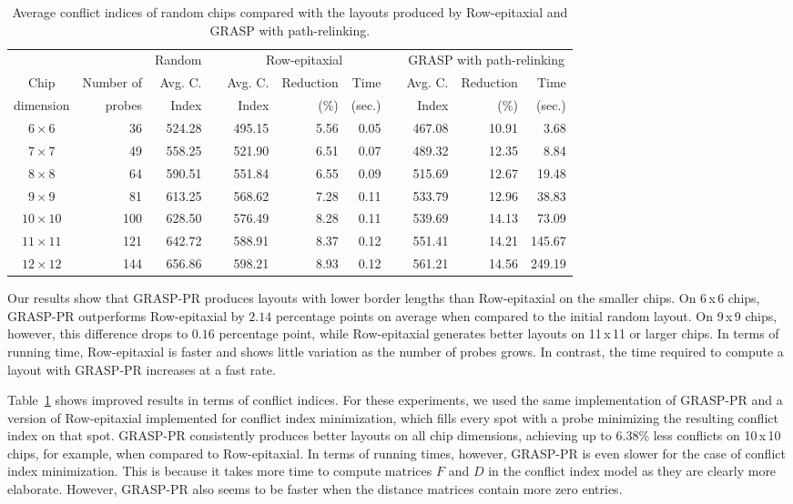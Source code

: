 \documentclass[english]{lni}
\begin{document}
\begin{table}[t]
\caption{Average conflict indices of random chips compared with the layouts produced by
Row-epitaxial and GRASP with path-relinking.\label{tab:graspr_reptx_ci}}
\vspace*{2ex}
\scriptsize{
\begin{tabular}{crrcrrrcrrr}
          &            & Random & & \multicolumn{3}{c}{Row-epitaxial}  & & \multicolumn{3}{c}{GRASP with path-relinking}  \\ \cline{3-3} \cline{5-7} \cline{9-11}
Chip      & Number of  & Avg. C.& & Avg. C.& Reduction & Time          & & Avg. C.& Reduction & Time   \\
dimension & probes     & Index  & & Index  & (\%)      & (sec.)        & & Index  & (\%)      & (sec.) \\
\hline
$6\times 6$   &  36 & 524.28 & & 495.15 & 5.56 & 0.05 & & 467.08 & 10.91 &   3.68 \\
$7\times 7$   &  49 & 558.25 & & 521.90 & 6.51 & 0.07 & & 489.32 & 12.35 &   8.84 \\
$8\times 8$   &  64 & 590.51 & & 551.84 & 6.55 & 0.09 & & 515.69 & 12.67 &  19.48 \\
$9\times 9$   &  81 & 613.25 & & 568.62 & 7.28 & 0.11 & & 533.79 & 12.96 &  38.83 \\
$10\times 10$ & 100 & 628.50 & & 576.49 & 8.28 & 0.11 & & 539.69 & 14.13 &  73.09 \\
$11\times 11$ & 121 & 642.72 & & 588.91 & 8.37 & 0.12 & & 551.41 & 14.21 & 145.67 \\
$12\times 12$ & 144 & 656.86 & & 598.21 & 8.93 & 0.12 & & 561.21 & 14.56 & 249.19 \\
\hline
\end{tabular}}
\end{table}

Our results show that GRASP-PR produces layouts with lower border lengths than
Row-epitaxial on the smaller chips. On 6\,x\,6 chips, GRASP-PR
outperforms Row-epitaxial by $2.14$ percentage points on average when compared to
the initial random layout. On 9\,x\,9 chips, however, this difference drops to
$0.16$ percentage point, while Row-epitaxial generates better layouts on 11\,x\,11
or larger chips.
In terms of running time, Row-epitaxial is faster and shows little variation
as the number of probes grows. In contrast, the time required to compute a
layout with GRASP-PR increases at a fast rate.

Table~\ref{tab:graspr_reptx_ci} shows improved results in terms of conflict indices.
For these experiments, we used the same implementation of GRASP-PR and a version of
Row-epitaxial implemented for conflict index minimization, which fills every spot
with a probe minimizing the resulting conflict index on that spot. GRASP-PR
consistently produces better layouts on all chip dimensions, achieving up to
$6.38$\% less conflicts on 10\,x\,10 chips, for example, when compared to Row-epitaxial.
In terms of running times, however, GRASP-PR is even slower for the case of conflict
index minimization. This is because it takes more time to compute matrices $F$ and
$D$ in the conflict index model as they are clearly more elaborate. However, GRASP-PR
also seems to be faster when the distance matrices contain more zero entries.
\end{document}

